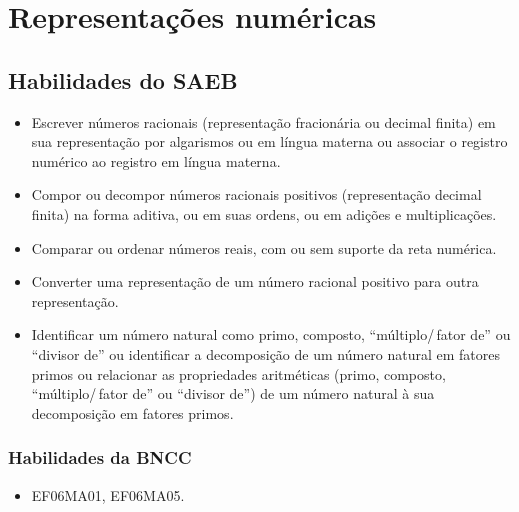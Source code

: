 
\chapter{Representações numéricas}


\section{Habilidades do SAEB}

\begin{itemize}
\item
  Escrever números racionais (representação fracionária ou decimal
  finita) em sua representação por algarismos ou em língua materna ou
  associar o registro numérico ao registro em língua materna.
\item
  Compor ou decompor números racionais positivos (representação decimal
  finita) na forma aditiva, ou em suas ordens, ou em adições e
  multiplicações.
\item
  Comparar ou ordenar números reais, com ou sem suporte da reta
  numérica.
\item
  Converter uma representação de um número racional positivo para outra
  representação. 
  \item Identificar um número natural como primo, composto,
  ``múltiplo/\,fator de'' ou ``divisor de'' ou identificar a decomposição
  de um número natural em fatores primos ou relacionar as propriedades
  aritméticas (primo, composto, ``múltiplo/\,fator de'' ou ``divisor de'')
  de um número natural à sua decomposição em fatores primos.
\end{itemize}

\subsection{Habilidades da BNCC}
\begin{itemize} 
\item EF06MA01, EF06MA05.
\end{itemize}

